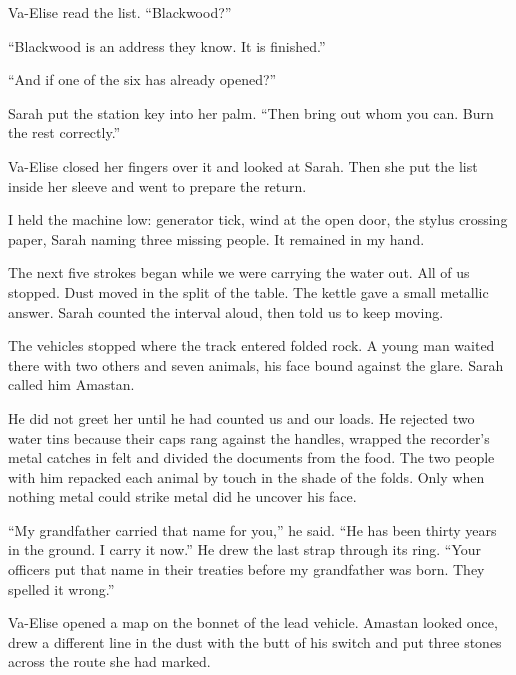 Va-Elise read the list. ``Blackwood?''\par

``Blackwood is an address they know. It is finished.''\par

``And if one of the six has already opened?''\par

Sarah put the station key into her palm. ``Then bring out whom you can. Burn the rest correctly.''\par

Va-Elise closed her fingers over it and looked at Sarah. Then she put the list inside her sleeve and went to prepare the return.\par

I held the machine low: generator tick, wind at the open door, the stylus crossing paper, Sarah naming three missing people. It remained in my hand.\par

The next five strokes began while we were carrying the water out. All of us stopped. Dust moved in the split of the table. The kettle gave a small metallic answer. Sarah counted the interval aloud, then told us to keep moving.\par

\ornament

The vehicles stopped where the track entered folded rock. A young man waited there with two others and seven animals, his face bound against the glare. Sarah called him Amastan.\par

He did not greet her until he had counted us and our loads. He rejected two water tins because their caps rang against the handles, wrapped the recorder's metal catches in felt and divided the documents from the food. The two people with him repacked each animal by touch in the shade of the folds. Only when nothing metal could strike metal did he uncover his face.\par

``My grandfather carried that name for you,'' he said. ``He has been thirty years in the ground. I carry it now.'' He drew the last strap through its ring. ``Your officers put that name in their treaties before my grandfather was born. They spelled it wrong.''\par

Va-Elise opened a map on the bonnet of the lead vehicle. Amastan looked once, drew a different line in the dust with the butt of his switch and put three stones across the route she had marked.\par

